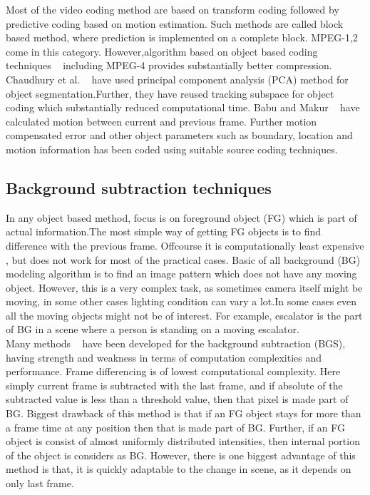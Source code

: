 Most of the video coding method are based on transform coding followed
by predictive coding based on motion estimation. Such methods are called
block based method, where prediction is implemented on a complete block.
MPEG-1,2 come in this category. However,algorithm based on object based
coding techniques ~\cite{7, 8} including MPEG-4 provides substantially
better compression. Chaudhury et al. ~\cite{7} have used principal
component analysis (PCA) method for object segmentation.Further, they
have reused tracking subspace for object coding which substantially
reduced computational time. Babu and Makur ~\cite{8} have calculated motion
between current and previous frame. Further motion compensated error and
other object parameters such as boundary, location and motion
information has been coded using suitable source coding techniques.  

\subsection{Background subtraction techniques}
In any object based method, focus is on foreground object (FG) which is part
of actual information.The most simple way of getting FG objects is to
find difference with the previous frame. Offcourse it is computationally
least expensive , but does not work for most of the practical
cases. Basic of all background (BG) modeling algorithm is to find an
image pattern which does not have any moving object. However, this is a
very complex task, as sometimes camera itself might be moving, in some
other cases lighting condition can vary a lot.In some cases even all the
moving objects might not be of interest. For example, escalator is the
part of BG in a scene where a person is standing on a moving
escalator.\\

Many methods ~\cite{9, 10, 11, 12, 13, 14} have been developed for the background
subtraction (BGS), having strength and weakness in terms of computation
complexities and performance. Frame differencing is of lowest
computational complexity. Here simply current frame is subtracted with
the last frame, and if absolute of the subtracted value is less than a
threshold value, then that pixel is made part of BG. Biggest drawback of
this method is that if an FG object stays for more than a frame time at
any position then that is made part of BG. Further, if an FG object is
consist of almost uniformly distributed intensities, then internal
portion of the object is considers as BG. However, there is one biggest
advantage of this method is that, it is quickly adaptable to the change
in scene, as it depends on only last frame.\\

